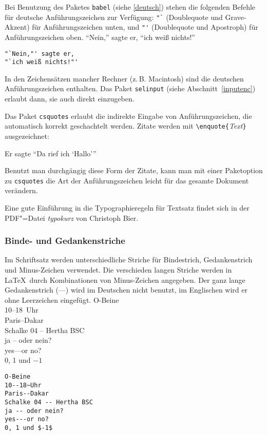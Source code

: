 Bei Benutzung des Paketes \texttt{babel} (siehe \ref{deutsch})
stehen die folgenden Befehle für
deutsche Anführungszeichen zur Verfügung:
\lstinline|"`| (Doublequote und Grave-Akzent) für Anführungszeichen
unten,
und
\lstinline|"'| (Doublequote und Apostroph) für Anführungszeichen oben.
\exa
"`Nein,"' sagte er,
"`ich weiß nichts!"'
\exb
\begin{verbatim}
"`Nein,"' sagte er,
"`ich weiß nichts!"'
\end{verbatim}
\exc
In den Zeichensätzen mancher Rechner (z.\,B. Macintosh) sind die deutschen
Anführungszeichen enthalten.  Das Paket \texttt{selinput} (siehe
Abschnitt~\ref{inputenc}) erlaubt dann, sie auch direkt einzugeben.

Das Paket \texttt{csquotes} erlaubt die indirekte Eingabe von Anführungszeichen, die automatisch korrekt geschachtelt werden. Zitate werden mit \lstinline|\enquote{|\textit{Text}\lstinline|}| ausgezeichnet:

\begin{LTXexample}
Er sagte \enquote{Da rief ich
\enquote{Hallo}}
\end{LTXexample}

Benutzt man durchgängig diese Form der Zitate, kann man mit einer Paketoption zu \texttt{csquotes} die Art der Anführungszeichen leicht für das gesamte Dokument verändern.

Eine gute Einführung in die Typographieregeln für Textsatz findet sich in der PDF"=Datei \emph{typokurz} von Christoph Bier\cite{typokurz}.

\subsubsection{Binde- und Gedankenstriche}

Im Schriftsatz werden unterschiedliche Striche für Bindestrich,
Gedankenstrich und Minus-Zeichen verwendet.
Die verschieden langen Striche werden in \LaTeX\ durch
Kombinationen von Minus-Zeichen angegeben. Der ganz lange
Gedankenstrich (\mbox{---}) wird im Deutschen nicht benutzt, im
Englischen wird er ohne Leerzeichen eingefügt.
\exa
O-Beine \\
10--18~Uhr \\
Paris--Dakar \\
Schalke 04 -- Hertha BSC \\
ja -- oder nein? \\
yes---or no? \\
0, 1 und $-1$
\exb
\begin{verbatim}
O-Beine
10--18~Uhr
Paris--Dakar
Schalke 04 -- Hertha BSC
ja -- oder nein?
yes---or no?
0, 1 und $-1$
\end{verbatim}
\exc

